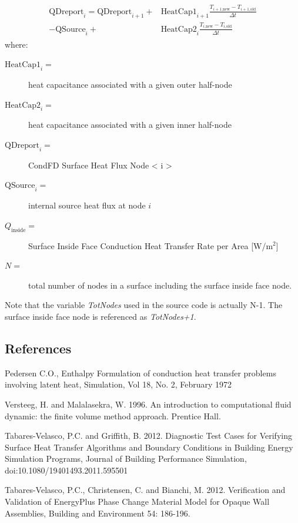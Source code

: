 \begin{align}
\begin{split}
\text{QDreport}_{i} = \text{QDreport}_{i+1}
+&\text{HeatCap1}_{i+1}\frac{T_{\text{$i+1$,new}} -
T_{\text{$i+1$,old}}}{\Delta t} \\
- \text{QSource}_{i}
+&\text{HeatCap2}_{i}
\frac{T_{\text{$i$,new}}-T_{\text{$i$,old}}}{\Delta t}
\end{split}
\end{align}
%
where:
\begin{description}
\item[\(\text{HeatCap1}_i =\)] heat capacitance associated with a given outer half-node
\item[\(\text{HeatCap2}_i =\)] heat capacitance associated with a given inner half-node
\item[\(\text{QDreport}_i =\)] CondFD Surface Heat Flux Node \textless{} i
\textgreater{}
\item[\(\text{QSource}_i =\)] internal source heat flux at node $i$
\item[\(Q_{\text{inside}} =\)] Surface Inside Face Conduction Heat Transfer Rate
per Area {[}W/m\(^{2}\){]}
\item[\(N =\)] total number of nodes in a surface including the surface inside face
node.
\end{description}
%
Note that the variable \emph{TotNodes} used in the source code is actually N-1.
The surface inside face node is referenced as \emph{TotNodes+1}.


\subsection{References}\label{references-013}

Pedersen C.O., Enthalpy Formulation of conduction heat transfer problems involving latent heat, Simulation, Vol 18, No. 2, February 1972

Versteeg, H. and Malalasekra, W. 1996. An introduction to computational fluid dynamic: the finite volume method approach. Prentice Hall.

Tabares-Velasco, P.C. and Griffith, B. 2012. Diagnostic Test Cases for Verifying Surface Heat Transfer Algorithms and Boundary Conditions in Building Energy Simulation Programs, Journal of Building Performance Simulation, doi:10.1080/19401493.2011.595501

Tabares-Velasco, P.C., Christensen, C. and Bianchi, M. 2012. Verification and Validation of EnergyPlus Phase Change Material Model for Opaque Wall Assemblies, Building and Environment 54: 186-196.
